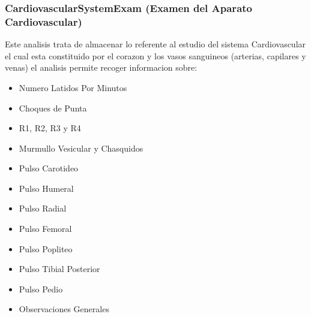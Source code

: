 \subsubsection{CardiovascularSystemExam (Examen del Aparato Cardiovascular)}

Este analisis trata de almacenar lo referente al estudio del sistema Cardiovascular
el cual esta constituido por el corazon y los vasos sanguineos (arterias, capilares
y venas) el analisis permite recoger informacion sobre:

\begin{itemize}
    \item Numero Latidos Por Minutos 
    \item Choques de Punta
    \item R1, R2, R3 y R4
    \item Murmullo Vesicular y Chasquidos
    \item Pulso Carotideo
    \item Pulso Humeral
    \item Pulso Radial
    \item Pulso Femoral
    \item Pulso Popliteo
    \item Pulso Tibial Posterior
    \item Pulso Pedio
    \item Observaciones Generales
\end{itemize}


